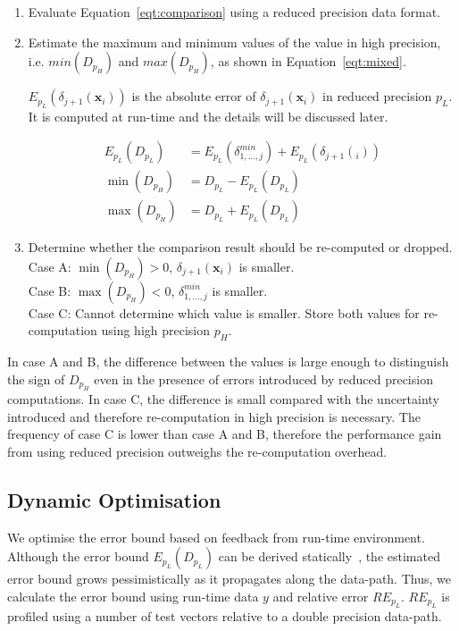 \begin{enumerate}
\item Evaluate Equation~\ref{eqt:comparison} using a reduced precision data format. 
\item Estimate the maximum and minimum values of the value in high precision, i.e. $min(D_{p_H})$ and $max(D_{p_H})$, as shown in Equation~\ref{eqt:mixed}.

$E_{p_L}(\delta_{j+1}(\boldsymbol{x}_i))$ is the absolute error of $\delta_{j+1}(\boldsymbol{x}_i)$ in reduced precision $p_L$.
It is computed at run-time and the details will be discussed later.

\begin{equation}
\begin{aligned}
E_{p_L}(D_{p_L}) &= E_{p_L}(\delta^{min}_{1,...,j}) + E_{p_L}(\delta_{j+1}(\boldsymbol{}_i)) \\
\min{(D_{p_H})} &= D_{p_L} - E_{p_L}(D_{p_L}) \\
\max{(D_{p_H})} &= D_{p_L} + E_{p_L}(D_{p_L})
\end{aligned}
\label{eqt:mixed}
\end{equation}

\item Determine whether the comparison result should be re-computed or dropped. \\
Case A: $\min{(D_{p_H})}>0$, $\delta_{j+1}(\boldsymbol{x}_i)$ is smaller. \\
Case B: $\max{(D_{p_H})}<0$, $\delta^{min}_{1,...,j}$ is smaller. \\
Case C: Cannot determine which value is smaller. Store both values for re-computation using high precision $p_H$.
\end{enumerate}

In case A and B, the difference between the values is large enough to distinguish the sign of $D_{p_H}$ even in the presence of errors introduced by reduced precision computations.
In case C, the difference is small compared with the uncertainty introduced and therefore re-computation in high precision is necessary.
The frequency of case C is lower than case A and B, therefore the performance gain from using reduced precision outweighs the re-computation overhead.

\subsection{Dynamic Optimisation}
We optimise the error bound based on feedback from run-time environment.
Although the error bound $E_{p_L}(D_{p_L})$ can be derived statically~\cite{lee05},
the estimated error bound grows pessimistically as it propagates along the data-path.
Thus, we calculate the error bound using run-time data $y$ and relative error $RE_{p_L}$.
$RE_{p_L}$ is profiled using a number of test vectors relative to a double precision data-path.

